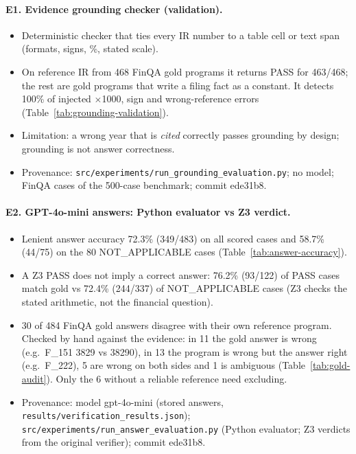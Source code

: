 \begingroup\sloppy

\paragraph{E1. Evidence grounding checker (validation).}
\begin{itemize}
\item Deterministic checker that ties every IR number to a table cell or text span (formats, signs, \%, stated scale).
\item On reference IR from 468 FinQA gold programs it returns PASS for 463/468; the rest are gold programs that
  write a filing fact as a constant. It detects 100\% of injected $\times$1000, sign and wrong-reference errors
  (Table~\ref{tab:grounding-validation}).
\item Limitation: a wrong year that is \emph{cited} correctly passes grounding by design; grounding is not answer correctness.
\item Provenance: \texttt{src/experiments/run\_grounding\_evaluation.py}; no model; FinQA cases of the 500-case benchmark; commit ede31b8.
\end{itemize}

\paragraph{E2. GPT-4o-mini answers: Python evaluator vs Z3 verdict.}
\begin{itemize}
\item Lenient answer accuracy 72.3\% (349/483) on all scored cases and 58.7\% (44/75) on the 80 NOT\_APPLICABLE cases
  (Table~\ref{tab:answer-accuracy}).
\item A Z3 PASS does not imply a correct answer: 76.2\% (93/122) of PASS cases match gold vs 72.4\% (244/337) of NOT\_APPLICABLE cases
  (Z3 checks the stated arithmetic, not the financial question).
\item 30 of 484 FinQA gold answers disagree with their own reference program. Checked by hand against the
  evidence: in 11 the gold answer is wrong (e.g.\ F\_151 3829 vs 38290), in 13 the program is wrong but
  the answer right (e.g.\ F\_222), 5 are wrong on both sides and 1 is ambiguous
  (Table~\ref{tab:gold-audit}). Only the 6 without a reliable reference need excluding.
\item Provenance: model gpt-4o-mini (stored answers, \texttt{results/verification\_results.json});
  \texttt{src/experiments/run\_answer\_evaluation.py} (Python evaluator; Z3 verdicts from the original verifier); commit ede31b8.
\end{itemize}

